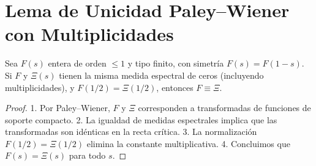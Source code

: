 \section{Lema de Unicidad Paley--Wiener con Multiplicidades}

\begin{lemma}
Sea $F(s)$ entera de orden $\leq 1$ y tipo finito, con simetría $F(s)=F(1-s)$.
Si $F$ y $\Xi(s)$ tienen la misma medida espectral de ceros (incluyendo multiplicidades),
y $F(1/2)=\Xi(1/2)$, entonces $F \equiv \Xi$.
\end{lemma}

\begin{proof}
1. Por Paley--Wiener, $F$ y $\Xi$ corresponden a transformadas de funciones de soporte compacto.
2. La igualdad de medidas espectrales implica que las transformadas son idénticas en la recta crítica.
3. La normalización $F(1/2)=\Xi(1/2)$ elimina la constante multiplicativa.
4. Concluimos que $F(s)=\Xi(s)$ para todo $s$.
\end{proof}
